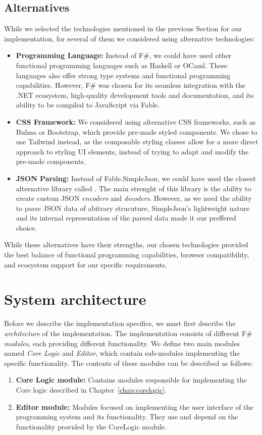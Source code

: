 \subsection{Alternatives}
While we selected the technologies mentioned in the previous Section for our implementation, for several of them we considered using alternative technologies:
\begin{itemize}
	\item \textbf{Programming Language:} Instead of F\#, we could have used other functional programming languages such as Haskell or OCaml.
	      These languages also offer strong type systems and functional programming capabilities.
	      However, F\# was chosen for its seamless integration with the .NET ecosystem, high-quality development tools and documentation, and its ability to be compiled to JavaScript via Fable.

	\item \textbf{CSS Framework:} We considered using alternative CSS frameworks, such as Bulma or Bootstrap, which provide pre-made styled components.
	      We chose to use Tailwind instead, as the composable styling classes allow for a more direct approach to styling UI elements, instead of trying to adapt and modify the pre-made components.

	\item \textbf{JSON Parsing:} Instead of Fable.SimpleJson, we could have used the closest alternative library called \citet{thoth}.
	      The main strenght of this library is the ability to create custom JSON \emph{encoders} and \emph{decoders}.
	      However, as we need the ability to parse JSON data of abitrary strucuture, SimpleJson's lightweight nature and its internal representation of the parsed data made it our preffered choice.
\end{itemize}
While these alternatives have their strengths, our chosen technologies provided the best balance of functional programming capabilities, browser compatibility, and ecosystem support for our specific requirements.



\section{System architecture}
\label{sec:appArch}
Before we describe the implementation specifics, we must first describe the \emph{architecture} of the implementation.
The implementation consists of different F\# \emph{modules}, each providing different functionality.
We define two main modules named \emph{Core Logic} and \emph{Editor}, which contain sub-modules implementing the specific functionality.
The contents of these modules can be described as follows:
\begin{enumerate}
	\item \textbf{Core Logic module:} Contains modules responsible for implementing the Core logic described in Chapter~\ref{chap:corelogic}.
	\item \textbf{Editor module:} Modules focused on implementing the user interface of the programming system and its functionality.
	      They use and depend on the functionality provided by the CoreLogic module.
\end{enumerate}


